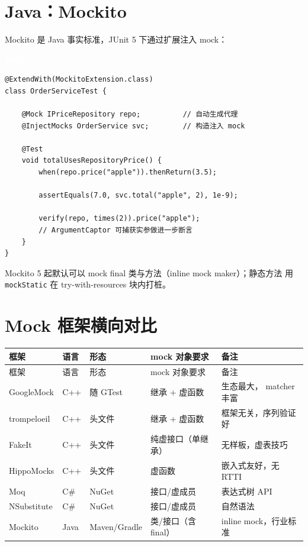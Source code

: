 \documentclass[12pt,a4paper,fontset=fandol]{ctexbook}
\newcommand{\javalabel}{%
  \begin{tcolorbox}[enhanced,colback=javaheadbg,colframe=javaheadbg,
    arc=1mm,boxrule=0mm,left=6pt,right=6pt,top=2pt,bottom=2pt,
    halign=left,oversize]
    \textcolor{white}{\small\bfseries Java}
  \end{tcolorbox}\vspace{-4pt}}
\begin{document}
\section{Java：Mockito}

Mockito 是 Java 事实标准，JUnit 5 下通过扩展注入 mock：

\javalabel
\begin{lstlisting}
@ExtendWith(MockitoExtension.class)
class OrderServiceTest {

    @Mock IPriceRepository repo;          // 自动生成代理
    @InjectMocks OrderService svc;        // 构造注入 mock

    @Test
    void totalUsesRepositoryPrice() {
        when(repo.price("apple")).thenReturn(3.5);

        assertEquals(7.0, svc.total("apple", 2), 1e-9);

        verify(repo, times(2)).price("apple");
        // ArgumentCaptor 可捕获实参做进一步断言
    }
}
\end{lstlisting}

Mockito 5 起默认可以 mock final 类与方法（inline mock maker）；静态方法
用 \texttt{mockStatic} 在 try-with-resources 块内打桩。

\section{Mock 框架横向对比}

{
\scriptsize
\setlength{\tabcolsep}{2pt}
\begin{longtable}{p{2.4cm}p{2.4cm}p{3.2cm}p{2.8cm}p{3.2cm}}
\toprule
框架 & 语言 & 形态 & mock 对象要求 & 备注 \\
\midrule
\endfirsthead
\toprule
框架 & 语言 & 形态 & mock 对象要求 & 备注 \\
\midrule
\endhead
GoogleMock & C++ & 随 GTest & 继承 + 虚函数 & 生态最大， matcher 丰富 \\
trompeloeil & C++ & 头文件 & 继承 + 虚函数 & 框架无关，序列验证好 \\
FakeIt & C++ & 头文件 & 纯虚接口（单继承） & 无样板，虚表技巧 \\
HippoMocks & C++ & 头文件 & 虚函数 & 嵌入式友好，无 RTTI \\
Moq & C\# & NuGet & 接口/虚成员 & 表达式树 API \\
NSubstitute & C\# & NuGet & 接口/虚成员 & 自然语法 \\
Mockito & Java & Maven/Gradle & 类/接口（含 final） & inline mock，行业标准 \\
\bottomrule
\end{longtable}
}
\end{document}
